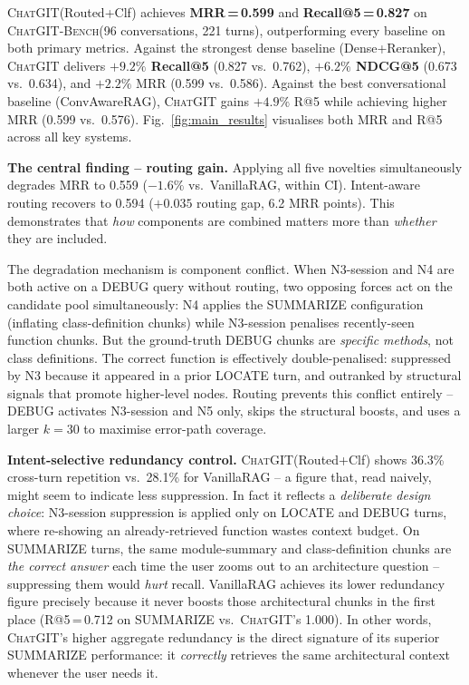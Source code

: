 \documentclass[conference]{IEEEtran}
\newcommand{\chatgit}{\textsc{ChatGIT}\xspace}
\newcommand{\conv}{\textsc{ChatGIT-Bench}\xspace}
\begin{document}
\chatgit (Routed+Clf) achieves \textbf{MRR\,=\,0.599} and
\textbf{Recall@5\,=\,0.827} on \conv (96 conversations, 221 turns),
outperforming every baseline on both primary metrics. Against the strongest
dense baseline (Dense+Reranker), \chatgit delivers \textbf{$+9.2\%$
Recall@5} (0.827 vs.\ 0.762), \textbf{$+6.2\%$ NDCG@5} (0.673 vs.\ 0.634),
and $+2.2\%$ MRR (0.599 vs.\ 0.586). Against the best conversational
baseline (ConvAwareRAG), \chatgit gains $+4.9\%$ R@5 while achieving
higher MRR (0.599 vs.\ 0.576). Fig.~\ref{fig:main_results}
visualises both MRR and R@5 across all key systems.

\textbf{The central finding -- routing gain.} Applying all five novelties
simultaneously degrades MRR to 0.559 ($-1.6\%$ vs.\ VanillaRAG, within
CI). Intent-aware routing recovers to 0.594 ($+0.035$ routing gap,
6.2 MRR points). This demonstrates that \emph{how} components are
combined matters more than \emph{whether} they are included.

The degradation mechanism is component conflict. When N3-session and N4
are both active on a DEBUG query without routing, two opposing forces act
on the candidate pool simultaneously: N4 applies the SUMMARIZE
configuration (inflating class-definition chunks) while N3-session
penalises recently-seen function chunks. But the ground-truth DEBUG
chunks are \emph{specific methods}, not class definitions. The correct
function is effectively double-penalised: suppressed by N3 because it
appeared in a prior LOCATE turn, and outranked by structural signals that
promote higher-level nodes. Routing prevents this conflict entirely --
DEBUG activates N3-session and N5 only, skips the structural boosts, and
uses a larger $k{=}30$ to maximise error-path coverage.

\textbf{Intent-selective redundancy control.}
\chatgit (Routed+Clf) shows 36.3\% cross-turn repetition vs.\ 28.1\% for
VanillaRAG -- a figure that, read naively, might seem to indicate less
suppression. In fact it reflects a \emph{deliberate design choice}: N3-session
suppression is applied only on LOCATE and DEBUG turns, where re-showing an
already-retrieved function wastes context budget. On SUMMARIZE turns, the
same module-summary and class-definition chunks are \emph{the correct answer}
each time the user zooms out to an architecture question -- suppressing
them would \emph{hurt} recall. VanillaRAG achieves its lower redundancy
figure precisely because it never boosts those architectural chunks in the
first place (R@5\,=\,0.712 on SUMMARIZE vs.\ \chatgit's 1.000). In other
words, \chatgit's higher aggregate redundancy is the direct signature of
its superior SUMMARIZE performance: it \emph{correctly} retrieves the
same architectural context whenever the user needs it.
\end{document}
